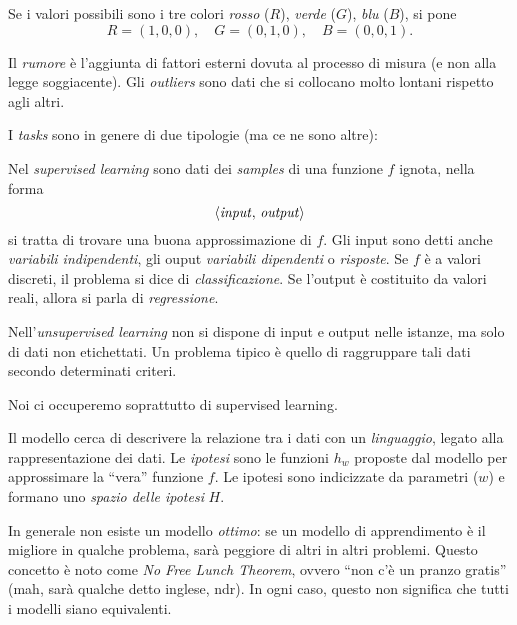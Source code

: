 \begin{example}
Se i valori possibili sono i tre colori \emph{rosso} ($R$), \emph{verde} ($G$), \emph{blu} ($B$), si pone
\begin{equation}
R=(1,0,0),\quad G=(0,1,0),\quad B=(0,0,1).
\end{equation}
\end{example}

\begin{definition}
Il \emph{rumore} è l'aggiunta di fattori esterni dovuta al processo di misura (e non alla legge soggiacente). Gli \emph{outliers} sono dati che si collocano molto lontani rispetto agli altri.
\end{definition}

I \emph{tasks} sono in genere di due tipologie (ma ce ne sono altre):

\begin{definition}
Nel \emph{supervised learning} sono dati dei \emph{samples} di una funzione $f$ ignota, nella forma \[\langle\text{\emph{input}},\,\text{\emph{output}}\rangle\] si tratta di trovare una buona approssimazione di $f$. Gli input sono detti anche \emph{variabili indipendenti}, gli ouput \emph{variabili dipendenti} o \emph{risposte}. Se $f$ è a valori discreti, il problema si dice di \emph{classificazione}. Se l'output è costituito da valori reali, allora si parla di \emph{regressione}.
\end{definition}

\begin{definition}
Nell'\emph{unsupervised learning} non si dispone di input e output nelle istanze, ma solo di dati non etichettati. Un problema tipico è quello di raggruppare tali dati secondo determinati criteri.
\end{definition}

Noi ci occuperemo soprattutto di supervised learning.

\begin{definition}
Il modello cerca di descrivere la relazione tra i dati con un \emph{linguaggio}, legato alla rappresentazione dei dati. Le \emph{ipotesi} sono le funzioni $h_w$ proposte dal modello per approssimare la “vera” funzione $f$. Le ipotesi sono indicizzate da parametri ($w$) e formano uno \emph{spazio delle ipotesi} $H$.
\end{definition}

In generale non esiste un modello \emph{ottimo}: se un modello di apprendimento è il migliore in qualche problema, sarà peggiore di altri in altri problemi. Questo concetto è noto come \emph{No Free Lunch Theorem}, ovvero “non c'è un pranzo gratis” (mah, sarà qualche detto inglese, ndr). In ogni caso, questo non significa che tutti i modelli siano equivalenti.

